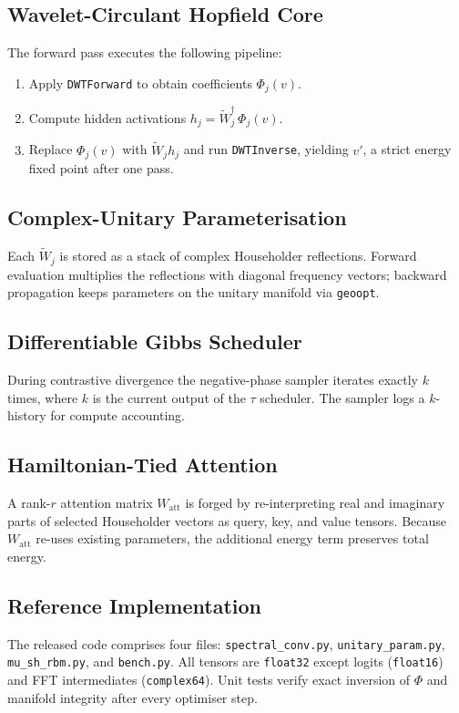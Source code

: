 \documentclass{article} %
\begin{document}
\subsection{Wavelet-Circulant Hopfield Core}
The forward pass executes the following pipeline:
\begin{enumerate}
    \item Apply \texttt{DWTForward} to obtain coefficients $\Phi_{j}(v)$.
    \item Compute hidden activations $h_{j}=\widetilde W_{j}^{\dagger}\,\Phi_{j}(v)$.
    \item Replace $\Phi_{j}(v)$ with $\widetilde W_{j}h_{j}$ and run \texttt{DWTInverse}, yielding $v'$, a strict energy fixed point after one pass.
\end{enumerate}

\subsection{Complex-Unitary Parameterisation}
Each $\widetilde W_{j}$ is stored as a stack of complex Householder reflections. Forward evaluation multiplies the reflections with diagonal frequency vectors; backward propagation keeps parameters on the unitary manifold via \texttt{geoopt}.

\subsection{Differentiable Gibbs Scheduler}
During contrastive divergence the negative-phase sampler iterates exactly $k$ times, where $k$ is the current output of the $\tau$ scheduler. The sampler logs a $k$-history for compute accounting.

\subsection{Hamiltonian-Tied Attention}
A rank-$r$ attention matrix $W_{\text{att}}$ is forged by re-interpreting real and imaginary parts of selected Householder vectors as query, key, and value tensors. Because $W_{\text{att}}$ re-uses existing parameters, the additional energy term preserves total energy.

\subsection{Reference Implementation}
The released code comprises four files: \texttt{spectral\_conv.py}, \texttt{unitary\_param.py}, \texttt{mu\_sh\_rbm.py}, and \texttt{bench.py}. All tensors are \texttt{float32} except logits (\texttt{float16}) and FFT intermediates (\texttt{complex64}). Unit tests verify exact inversion of $\Phi$ and manifold integrity after every optimiser step.
\end{document}
